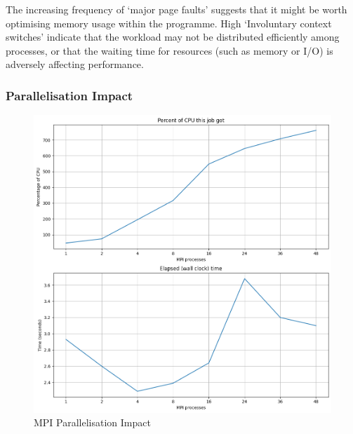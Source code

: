 \documentclass[
]{article}
\begin{document}
The increasing frequency of `major page faults' suggests that it might
be worth optimising memory usage within the programme. High `Involuntary
context switches' indicate that the workload may not be distributed
efficiently among processes, or that the waiting time for resources
(such as memory or I/O) is adversely affecting performance.

\subsubsection{Parallelisation Impact}\label{parallelisation-impact-1}

\begin{figure}
\centering
\includegraphics{figures/par_mpi.png}
\caption{MPI Parallelisation Impact}
\end{figure}
\end{document}
